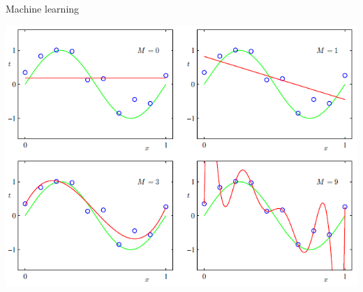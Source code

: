 \begin{frame}
  \begin{center}
    \Large{Machine learning}
  \end{center}
\end{frame}

\begin{frame}
  \begin{center}
    \includegraphics[scale=0.45]{./pictures/polynomials.png}
  \end{center}
\end{frame}



